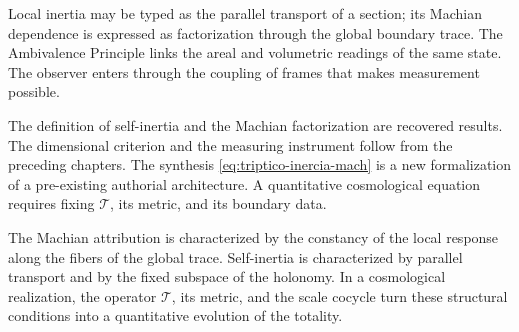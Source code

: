 \begin{resultbox}
Local inertia may be typed as the parallel transport of a section; its
Machian dependence is expressed as factorization through the global boundary
trace. The Ambivalence Principle links the areal and volumetric readings
of the same state. The observer enters through the coupling of frames that
makes measurement possible.
\end{resultbox}

\begin{statusbox}
The definition of self-inertia and the Machian factorization are recovered
results. The dimensional criterion and the measuring instrument follow from
the preceding chapters. The synthesis \eqref{eq:triptico-inercia-mach} is a
new formalization of a pre-existing authorial architecture. A quantitative
cosmological equation requires fixing \(\mathcal T\), its metric, and its boundary
data.
\end{statusbox}

The Machian attribution is characterized by the constancy of the local
response along the fibers of the global trace. Self-inertia is characterized
by parallel transport and by the fixed subspace of the holonomy. In a
cosmological realization, the operator \(\mathcal T\), its metric, and the scale
cocycle turn these structural conditions into a quantitative evolution of
the totality.
